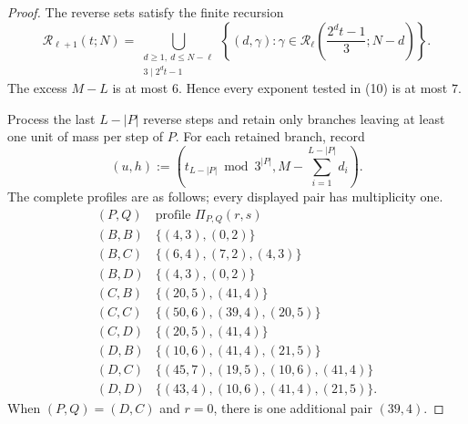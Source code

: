 \documentclass[11pt]{article}
\begin{document}
\begin{proof}
The reverse sets satisfy the finite recursion
\[
 \mathcal R_{\ell+1}(t;N)
 =\bigcup_{\substack{d\geq1,\ d\leq N-\ell\\
                     3\mid2^dt-1}}
 \left\{(d,\gamma):
 \gamma\in\mathcal R_\ell
 \left(\frac{2^dt-1}{3};N-d\right)\right\}.
 \tag{10}
\]
The excess $M-L$ is at most $6$.  Hence every exponent tested in (10)
is at most $7$.

Process the last $L-|P|$ reverse steps and retain only branches leaving
at least one unit of mass per step of $P$.  For each retained branch,
record
\[
 (u,h):=
 \left(t_{L-|P|}\bmod3^{|P|},
       M-\sum_{i=1}^{L-|P|}d_i\right).
 \tag{11}
\]
\newpage
The complete profiles are as follows; every displayed pair has
multiplicity one.
\[
\begin{array}{c|c}
(P,Q)&\text{profile }\Pi_{P,Q}(r,s)\\ \hline
(B,B)&\{(4,3),(0,2)\}\\
(B,C)&\{(6,4),(7,2),(4,3)\}\\
(B,D)&\{(4,3),(0,2)\}\\[1mm]
(C,B)&\{(20,5),(41,4)\}\\
(C,C)&\{(50,6),(39,4),(20,5)\}\\
(C,D)&\{(20,5),(41,4)\}\\[1mm]
(D,B)&\{(10,6),(41,4),(21,5)\}\\
(D,C)&\{(45,7),(19,5),(10,6),(41,4)\}\\
(D,D)&\{(43,4),(10,6),(41,4),(21,5)\}.
\end{array}
\tag{12}
\]
When $(P,Q)=(D,C)$ and $r=0$, there is one additional pair $(39,4)$.


\end{proof}
\end{document}
